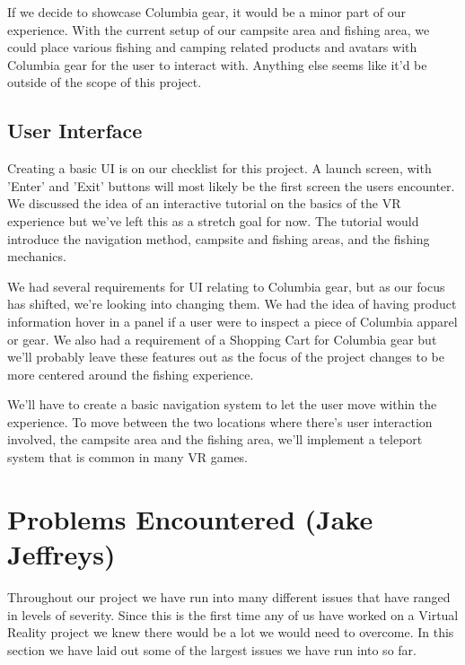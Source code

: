 \documentclass[10pt,journal,compsoc,onecolumn, draftclsnofoot]{IEEEtran}
\begin{document}
If we decide to showcase Columbia gear, it would be a minor part of our experience. With the current setup of our campsite area and fishing area, we could place various fishing and camping related products and avatars with Columbia gear for the user to interact with. Anything else seems like it'd be outside of the scope of this project.

\subsection{User Interface}
Creating a basic UI is on our checklist for this project. A launch screen, with 'Enter' and 'Exit' buttons will most likely be the first screen the users encounter. We discussed the idea of an interactive tutorial on the basics of the VR experience but we've left this as a stretch goal for now. The tutorial would introduce the navigation method, campsite and fishing areas, and the fishing mechanics.

We had several requirements for UI relating to Columbia gear, but as our focus has shifted, we're looking into changing them. We had the idea of having product information hover in a panel if a user were to inspect a piece of Columbia apparel or gear. We also had a requirement of a Shopping Cart for Columbia gear but we'll probably leave these features out as the focus of the project changes to be more centered around the fishing experience.

We'll have to create a basic navigation system to let the user move within the experience. To move between the two locations where there's user interaction involved, the campsite area and the fishing area, we'll implement a teleport system that is common in many VR games.

\section{Problems Encountered (Jake Jeffreys)}
Throughout our project we have run into many different issues that have ranged in levels of severity.
Since this is the first time any of us have worked on a Virtual Reality project we knew there would be a lot we would need to overcome.
In this section we have laid out some of the largest issues we have run into so far.
\end{document}

